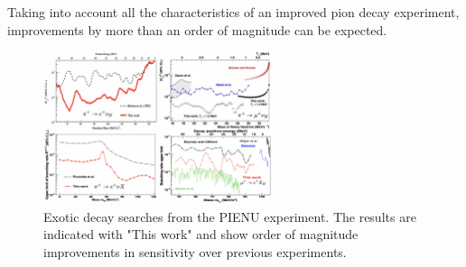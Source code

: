 Taking into account all the characteristics of an improved pion decay experiment, improvements by more than an order of magnitude can be expected.
\begin{figure}
    \centering
    \includegraphics[width=0.6\textwidth]{sections/figures/RareResults.png}
    \caption{Exotic decay searches from the PIENU experiment. The 
    results are indicated with "This work" and show order of magnitude improvements in sensitivity over
    previous experiments.}
    \label{fig:decays}
\end{figure}
